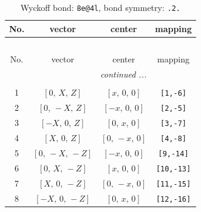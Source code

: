 \documentclass[fleqn,8pt]{jsarticle}
\begin{document}
\begin{longtable}{cccc}
\caption{Wyckoff bond: {\tt 8e@4l}, bond symmetry: {\tt .2.}}
 \\
 \hline \hline
No. & vector & center & mapping \\ \hline \endfirsthead

\multicolumn{3}{l}{\tablename\ \thetable{}} \\
 \hline \hline
No. & vector & center & mapping \\ \hline \endhead

 \hline \hline
\multicolumn{3}{r}{\footnotesize\it continued ...} \\ \endfoot

 \hline \hline
\multicolumn{3}{r}{} \\ \endlastfoot

1 & $\left[ 0,\, X,\, Z \right]$ & $\left[ x,\, 0,\, 0 \right]$ & {\tt [1,-6]} \\ \hline
2 & $\left[ 0,\, - X,\, Z \right]$ & $\left[ - x,\, 0,\, 0 \right]$ & {\tt [2,-5]} \\ \hline
3 & $\left[ - X,\, 0,\, Z \right]$ & $\left[ 0,\, x,\, 0 \right]$ & {\tt [3,-7]} \\ \hline
4 & $\left[ X,\, 0,\, Z \right]$ & $\left[ 0,\, - x,\, 0 \right]$ & {\tt [4,-8]} \\ \hline
5 & $\left[ 0,\, - X,\, - Z \right]$ & $\left[ - x,\, 0,\, 0 \right]$ & {\tt [9,-14]} \\ \hline
6 & $\left[ 0,\, X,\, - Z \right]$ & $\left[ x,\, 0,\, 0 \right]$ & {\tt [10,-13]} \\ \hline
7 & $\left[ X,\, 0,\, - Z \right]$ & $\left[ 0,\, - x,\, 0 \right]$ & {\tt [11,-15]} \\ \hline
8 & $\left[ - X,\, 0,\, - Z \right]$ & $\left[ 0,\, x,\, 0 \right]$ & {\tt [12,-16]} \\
\end{longtable}
\renewcommand{\arraystretch}{1.2}
\end{document}
